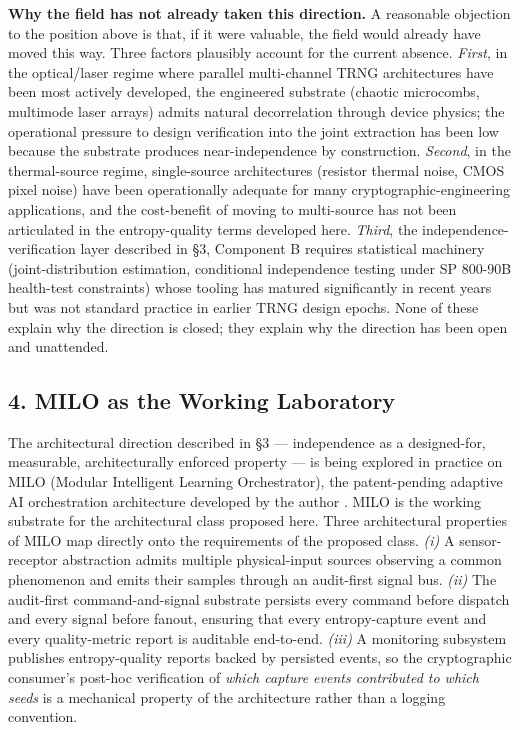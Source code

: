 \textbf{Why the field has not already taken this direction.} A
reasonable objection to the position above is that, if it were valuable,
the field would already have moved this way. Three factors plausibly
account for the current absence. \emph{First}, in the optical/laser
regime where parallel multi-channel TRNG architectures have been most
actively developed, the engineered substrate (chaotic microcombs,
multimode laser arrays) admits natural decorrelation through device
physics; the operational pressure to design verification into the joint
extraction has been low because the substrate produces near-independence
by construction. \emph{Second}, in the thermal-source regime,
single-source architectures (resistor thermal noise, CMOS pixel noise)
have been operationally adequate for many cryptographic-engineering
applications, and the cost-benefit of moving to multi-source has not
been articulated in the entropy-quality terms developed here.
\emph{Third}, the independence-verification layer described in §3,
Component B requires statistical machinery (joint-distribution
estimation, conditional independence testing under SP 800-90B
health-test constraints) whose tooling has matured significantly in
recent years but was not standard practice in earlier TRNG design
epochs. None of these explain why the direction is closed; they explain
why the direction has been open and unattended.

\subsection{4. MILO as the Working
Laboratory}\label{milo-as-the-working-laboratory}

The architectural direction described in §3 --- independence as a
designed-for, measurable, architecturally enforced property --- is being
explored in practice on MILO (Modular Intelligent Learning
Orchestrator), the patent-pending adaptive AI orchestration architecture
developed by the author \cite{ref8}. MILO is the working substrate for the
architectural class proposed here. Three architectural properties of
MILO map directly onto the requirements of the proposed class.
\emph{(i)} A sensor-receptor abstraction admits multiple physical-input
sources observing a common phenomenon and emits their samples through an
audit-first signal bus. \emph{(ii)} The audit-first command-and-signal
substrate persists every command before dispatch and every signal before
fanout, ensuring that every entropy-capture event and every
quality-metric report is auditable end-to-end. \emph{(iii)} A monitoring
subsystem publishes entropy-quality reports backed by persisted events,
so the cryptographic consumer's post-hoc verification of \emph{which
capture events contributed to which seeds} is a mechanical property of
the architecture rather than a logging convention.

